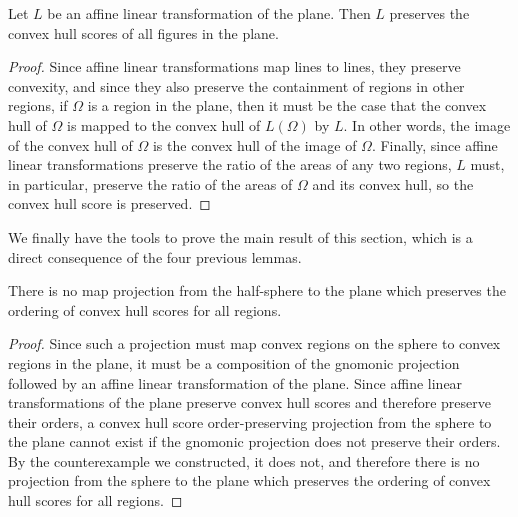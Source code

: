 \begin{lemma}\label{lem:noafflin}
Let $L$ be an affine linear transformation of the plane.  Then $L$ preserves the convex hull scores of all figures in the plane.

\end{lemma}
\begin{proof}
Since affine linear transformations map lines to lines, they preserve convexity, and since they also preserve the containment of regions in other regions, if $\Omega$ is a region in the plane, then it must be the case that the convex hull of $\Omega$ is mapped to the convex hull of $L(\Omega)$ by $L$.  In other words, the image of the convex hull of $\Omega$ is the convex hull of the image of $\Omega$.  Finally, since affine linear transformations preserve the ratio of the areas of any two regions, $L$ must, in particular, preserve the ratio of the areas of $\Omega$ and its convex hull, so the convex hull score is preserved.


\end{proof}


We finally have the tools to prove the main result of this section, which is a direct consequence of the four previous lemmas.

\begin{theorem}
There is no map projection from the half-sphere to the plane which preserves the ordering of convex hull scores for all regions.


\end{theorem}

\begin{proof}
Since such a projection must map convex regions on the sphere to convex regions in the plane, it must be a composition of the gnomonic projection followed by an affine linear transformation of the plane.  Since affine linear transformations of the plane preserve convex hull scores and therefore preserve their orders, a convex hull score order-preserving projection from the sphere to the plane cannot exist if the gnomonic projection does not preserve their orders.  By the counterexample we constructed, it does not, and therefore there is no projection from the sphere to the plane which preserves the ordering of convex hull scores for all regions.

\end{proof}
